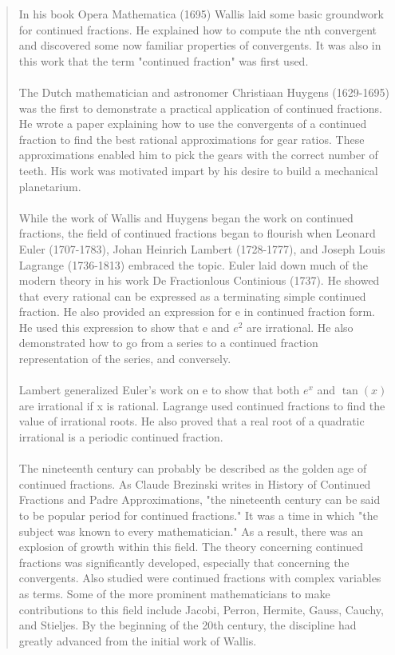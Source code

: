 \documentclass[a4paper]{article}
\begin{document}
\begin{quote}
  In his book Opera Mathematica (1695) Wallis laid some basic groundwork for continued fractions.
  He explained how to compute the nth convergent and discovered some now familiar properties of convergents.
  It was also in this work that the term "continued fraction" was first used.
  \\
  \\
  The Dutch mathematician and astronomer Christiaan Huygens (1629-1695) was the first to demonstrate a practical application of continued fractions.
  He wrote a paper explaining how to use the convergents of a continued fraction to find the best rational approximations for gear ratios.
  These approximations enabled him to pick the gears with the correct number of teeth.
  His work was motivated impart by his desire to build a mechanical planetarium.
  \\
  \\
  While the work of Wallis and Huygens began the work on continued fractions, the field of continued fractions began to flourish when Leonard Euler (1707-1783), Johan Heinrich Lambert (1728-1777), and Joseph Louis Lagrange (1736-1813) embraced the topic.
  Euler laid down much of the modern theory in his work De Fractionlous Continious (1737).
  He showed that every rational can be expressed as a terminating simple continued fraction.
  He also provided an expression for e in continued fraction form.
  He used this expression to show that e and $e^2$ are irrational.
  He also demonstrated how to go from a series to a continued fraction representation of the series, and conversely.
  \\
  \\
  Lambert generalized Euler's work on e to show that both $e^x$ and $\tan(x)$ are irrational if x is rational.
  Lagrange used continued fractions to find the value of irrational roots.
  He also proved that a real root of a quadratic irrational is a periodic continued fraction.
  \\
  \\
  The nineteenth century can probably be described as the golden age of continued fractions.
  As Claude Brezinski writes in History of Continued Fractions and Padre Approximations, "the nineteenth century can be said to be popular period for continued fractions."
  It was a time in which "the subject was known to every mathematician."
  As a result, there was an explosion of growth within this field.
  The theory concerning continued fractions was significantly developed, especially that concerning the convergents.
  Also studied were continued fractions with complex variables as terms.
  Some of the more prominent mathematicians to make contributions to this field include Jacobi, Perron, Hermite, Gauss, Cauchy, and Stieljes.
  By the beginning of the 20th century, the discipline had greatly advanced from the initial work of Wallis.
\end{quote}
\end{document}
